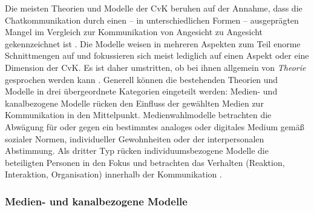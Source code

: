 Die meisten Theorien und Modelle der CvK beruhen auf der Annahme, dass die Chatkommunikation durch einen -- in unterschiedlichen Formen -- ausgeprägten Mangel im Vergleich zur Kommunikation von Angesicht zu Angesicht gekennzeichnet ist \citep[159]{trepte_medienpsychologie_2012}. Die Modelle weisen in mehreren Aspekten zum Teil enorme Schnittmengen auf und fokussieren sich meist lediglich auf einen Aspekt oder eine Dimension der CvK. Es ist daher umstritten, ob bei ihnen allgemein von \emph{Theorie} gesprochen werden kann \citep[429]{doring_c_2013}. Generell können die bestehenden Theorien und Modelle in drei übergeordnete Kategorien eingeteilt werden: Medien- und kanalbezogene Modelle rücken den Einfluss der gewählten Medien zur Kommunikation in den Mittelpunkt. Medienwahlmodelle betrachten die Abwägung für oder gegen ein bestimmtes analoges oder digitales Medium gemäß sozialer Normen, individueller Gewohnheiten oder der interpersonalen Abstimmung. Als dritter Typ rücken individuumsbezogene Modelle die beteiligten Personen in den Fokus und betrachten das Verhalten (Reaktion, Interaktion, Organisation) innerhalb der Kommunikation \citep[115\psqq]{misoch_online-kommunikation_2006}.




\subsubsection{Medien- und kanalbezogene Modelle}
\label{K2:subsubsec:medienbezogene-modelle}


